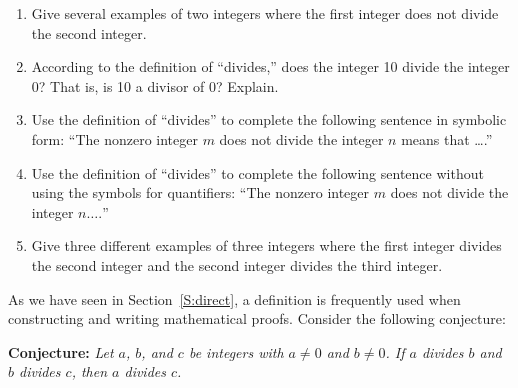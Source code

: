 \begin{previewactivity}
\begin{enumerate}
  \item Give several examples of two integers where the first integer does not divide the second integer.


  \item According to the definition of ``divides,'' does the integer  10  divide the integer  0?  That is, is  10  a divisor of  0?  Explain.

  \item Use the definition of ``divides'' to complete the following sentence in symbolic form:  ``The nonzero integer  $m$ does not divide the integer $n$ means that \ldots .''

  \item Use the definition of ``divides'' to complete the following sentence without using the symbols for quantifiers:  ``The nonzero integer  $m$  does not divide the integer $n \ldots .$''
  \item Give three different examples of three integers where the first integer divides the second integer and the second integer divides the third integer.  
\label{PA:divisor1}%
\end{enumerate}
As we have seen in Section~\ref{S:direct}, a definition is frequently used when constructing and writing mathematical proofs.  Consider the following conjecture:

\eighth
\setlength{\hangindent}{60pt}
\noindent
\textbf{Conjecture:} \emph{Let $a$, $b$, and $c$ be integers with $a \ne 0$ and $b \ne 0$.  If $a$ divides $b$ and $b$ divides $c$, then $a$ divides $c$.}


\end{previewactivity}
